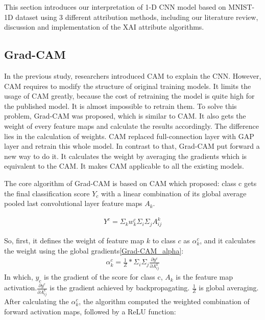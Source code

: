 \documentclass[conference]{IEEEtran}
\begin{document}
	This section introduces our interpretation of 1-D CNN model based on MNIST-1D dataset using 3 different attribution methods, including our literature review, discussion and implementation of the XAI attribute algorithms.
	
	\subsection{Grad-CAM}
	In the previous study, researchers introduced CAM to explain the CNN. However, CAM requires to modify the structure of original training models. It limits the usage of CAM greatly, because the cost of retraining the model is quite high for the published model. It is almost impossible to retrain them.
	To solve this problem, Grad-CAM was proposed, which is similar to CAM. It also gets the weight of every feature maps and calculate the results accordingly. The difference lies in the calculation of weights. CAM replaced full-connection layer with GAP layer and retrain this whole model. In contrast to that, Grad-CAM put forward a new way to do it.
	It calculates the weight by averaging the gradients which is equivalent to the CAM. It makes CAM applicable to all the existing models.\par
	
	The core algorithm of Grad-CAM is based on CAM which proposed: class c gets the final classification score $Y_{c}$ with a linear combination of its global average pooled last convolutional layer feature maps $A_{k}$.
	
	\begin{equation}
		\begin{aligned}
			Y^{c}=\Sigma_{k}w_{k}^{c}\Sigma_{i}\Sigma_{j}A_{ij}^{k}
			\label{Grad-CAM_Y}
		\end{aligned}
	\end{equation}
	
	So, first, it defines the weight of feature map $k$ to class $c$ as $\alpha_{k}^{c}$, and it calculates the weight using the global gradients\ref{Grad-CAM_alpha}:
	\begin{equation}
		\begin{aligned}
			\alpha_{k}^{c}=\frac{1}{Z}*\Sigma_{i}\Sigma_{j}\frac{\partial y^{c}}{\partial A_{ij}^{k}}
			\label{Grad-CAM_alpha}
		\end{aligned}
	\end{equation}
	In which, $y_{c}$ is the gradient of the score for class c, $A_{k}$ is the feature map activation.$\frac{\partial y^{c}}{\partial A_{ij}^{k}}$ is the gradient achieved by backpropagating. $\frac{1}{Z}$ is global averaging.
	After calculating the $\alpha_{k}^{c}$, the algorithm computed the weighted combination of forward activation maps, followed by a ReLU function:
	
\end{document}
